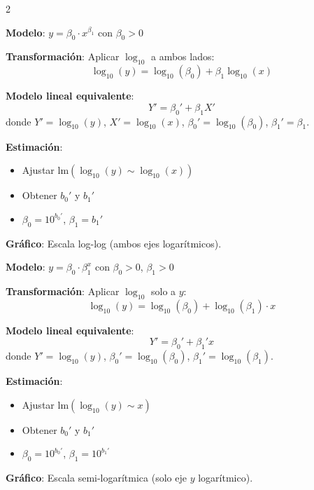 \documentclass[10pt,a4paper]{article}
\begin{document}
\begin{multicols}{2}
    \begin{tcolorbox}[title=Modelo Potencial, equal height group=RL3]
        \textbf{Modelo}: $y = \beta_0 \cdot x^{\beta_1}$ con $\beta_0 > 0$
        
        \textbf{Transformación}: Aplicar $\log_{10}$ a ambos lados:
        \[
            \log_{10}(y) = \log_{10}(\beta_0) + \beta_1 \log_{10}(x)
        \]
        
        \textbf{Modelo lineal equivalente}:
        \[
            Y' = \beta_0' + \beta_1 X'
        \]
        donde $Y' = \log_{10}(y)$, $X' = \log_{10}(x)$, $\beta_0' = \log_{10}(\beta_0)$, $\beta_1' = \beta_1$.
        
        \textbf{Estimación}:
        \begin{itemize}
            \item Ajustar $\text{lm}(\log_{10}(y) \sim \log_{10}(x))$
            \item Obtener $b_0'$ y $b_1'$
            \item $\beta_0 = 10^{b_0'}$, $\beta_1 = b_1'$
        \end{itemize}
        
        \textbf{Gráfico}: Escala log-log (ambos ejes logarítmicos).
    \end{tcolorbox}
    \begin{tcolorbox}[title=Modelo Exponencial, equal height group=RL3]
        \textbf{Modelo}: $y = \beta_0 \cdot \beta_1^x$ con $\beta_0 > 0$, $\beta_1 > 0$
        
        \textbf{Transformación}: Aplicar $\log_{10}$ solo a $y$:
        \[
            \log_{10}(y) = \log_{10}(\beta_0) + \log_{10}(\beta_1) \cdot x
        \]
        
        \textbf{Modelo lineal equivalente}:
        \[
            Y' = \beta_0' + \beta_1' x
        \]
        donde $Y' = \log_{10}(y)$, $\beta_0' = \log_{10}(\beta_0)$, $\beta_1' = \log_{10}(\beta_1)$.
        
        \textbf{Estimación}:
        \begin{itemize}
            \item Ajustar $\text{lm}(\log_{10}(y) \sim x)$
            \item Obtener $b_0'$ y $b_1'$
            \item $\beta_0 = 10^{b_0'}$, $\beta_1 = 10^{b_1'}$
        \end{itemize}
        
        \textbf{Gráfico}: Escala semi-logarítmica (solo eje $y$ logarítmico).
    \end{tcolorbox}
\end{multicols}
\end{document}
